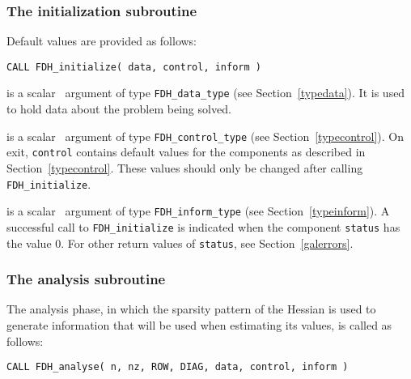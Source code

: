 \documentclass{galahad}
\newcommand{\packagename}{FDH}
\begin{document}

\subsubsection{The initialization subroutine}\label{subinit}
 Default values are provided as follows:
\vspace*{1mm}

\hspace{8mm}
{\tt CALL \packagename\_initialize( data, control, inform )}

\vspace*{-3mm}
\begin{description}

 is a scalar \intentinout\ argument of type
{\tt \packagename\_data\_type}
(see Section~\ref{typedata}). It is used to hold data about the problem being
solved.

 is a scalar \intentout\ argument of type
{\tt \packagename\_control\_type}
(see Section~\ref{typecontrol}).
On exit, {\tt control} contains default values for the components as
described in Section~\ref{typecontrol}.
These values should only be changed after calling
{\tt \packagename\_initialize}.

 is a scalar \intentout\ argument of type
{\tt \packagename\_inform\_type}
(see Section~\ref{typeinform}). A successful call to
{\tt \packagename\_initialize}
is indicated when the  component {\tt status} has the value 0.
For other return values of {\tt status}, see Section~\ref{galerrors}.

\end{description}


\subsubsection{The analysis subroutine}
The analysis phase, in which the sparsity pattern of the Hessian
is used to generate information that will be used when estimating
its values, is called as follows:

\vspace*{1mm}

\hspace{8mm}
{\tt CALL \packagename\_analyse( n, nz, ROW, DIAG, data, control, inform )}
\end{document}
